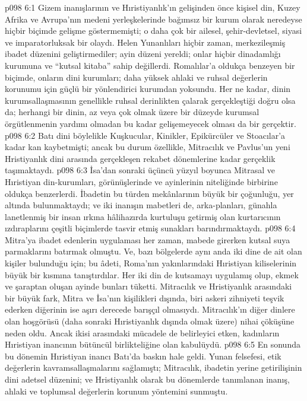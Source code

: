 \vs p098 6:1 Gizem inanışlarının ve Hıristiyanlık’ın gelişinden önce kişisel din, Kuzey Afrika ve Avrupa’nın medeni yerleşkelerinde bağımsız bir kurum olarak neredeyse hiçbir biçimde gelişme göstermemişti; o daha çok bir ailesel, şehir\hyp{}devletsel, siyasi ve imparatorluksak bir olaydı. Helen Yunanlıları hiçbir zaman, merkezileşmiş ibadet düzenini geliştirmediler; ayin düzeni yereldi; onlar hiçbir dinadamlığı kurumuna ve “kutsal kitaba” sahip değillerdi. Romalılar’a oldukça benzeyen bir biçimde, onların dini kurumları; daha yüksek ahlaki ve ruhsal değerlerin korunumu için güçlü bir yönlendirici kurumdan yoksundu. Her ne kadar, dinin kurumsallaşmasının genellikle ruhsal derinlikten çalarak gerçekleştiği doğru olsa da; herhangi bir dinin, az veya çok olmak üzere bir düzeyde kurumsal örgütlenmenin yardımı olmadan bu kadar gelişemeyecek olması da bir gerçektir.
\vs p098 6:2 Batı dini böylelikle Kuşkucular, Kinikler, Epikürcüler ve Stoacılar’a kadar kan kaybetmişti; ancak bu durum özellikle, Mitracılık ve Pavlus’un yeni Hristiyanlık dini arasında gerçekleşen rekabet dönemlerine kadar gerçeklik taşımaktaydı.
\vs p098 6:3 İsa’dan sonraki üçüncü yüzyıl boyunca Mitrasal ve Hıristiyan din\hyp{}kurumları, görünüşlerinde ve ayinlerinin niteliğinde birbirine oldukça benzerlerdi. İbadetin bu türden mekânlarının büyük bir çoğunluğu, yer altında bulunmaktaydı; ve iki inanışın mabetleri de, arka\hyp{}planları, günahla lanetlenmiş bir insan ırkına hâlihazırda kurtuluşu getirmiş olan kurtarıcının ızdıraplarını çeşitli biçimlerde tasvir etmiş sunakları barındırmaktaydı.
\vs p098 6:4 Mitra’ya ibadet edenlerin uygulaması her zaman, mabede girerken kutsal suya parmaklarını batırmak olmuştu. Ve, bazı bölgelerde aynı anda iki dine de ait olan kişiler bulunduğu için; bu âdeti, Roma’nın yakınlarındaki Hıristiyan kiliselerinin büyük bir kısmına tanıştırdılar. Her iki din de kutsamayı uygulamış olup, ekmek ve şaraptan oluşan ayinde bunları tüketti. Mitracılık ve Hristiyanlık arasındaki bir büyük fark, Mitra ve İsa’nın kişilikleri dışında, biri askeri zihniyeti teşvik ederken diğerinin ise aşırı derecede barışçıl olmasıydı. Mitracılık’ın diğer dinlere olan hoşgörüsü (daha sonraki Hıristiyanlık dışında olmak üzere) nihai çöküşüne neden oldu. Ancak ikisi arasındaki mücadele de belirleyici etken, kadınların Hıristiyan inancının bütüncül birlikteliğine olan kabulüydü.
\vs p098 6:5 En sonunda bu dönemin Hıristiyan inancı Batı’da baskın hale geldi. Yunan felsefesi, etik değerlerin kavramsallaşmalarını sağlamıştı; Mitracılık, ibadetin yerine getirilişinin dini adetsel düzenini; ve Hristiyanlık olarak bu dönemlerde tanımlanan inanış, ahlaki ve toplumsal değerlerin korunum yöntemini sunmuştu.
